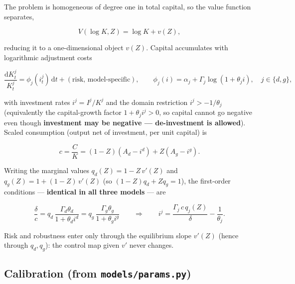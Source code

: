 \documentclass{article}
\begin{document}
The problem is homogeneous of degree one in total capital, so the value function
separates,

\begin{equation}
V(\log K, Z) = \log K + v(Z),
\end{equation}

reducing it to a one-dimensional object $v(Z)$. Capital accumulates with
logarithmic adjustment costs

\begin{equation}
\frac{\mathrm{d}K^j_t}{K^j_t} = \phi_j(i^j_t)\,\mathrm{d}t + (\text{risk, model-specific}),
\qquad
\phi_j(i) = \alpha_j + \Gamma_j\log(1+\theta_j i), \quad j\in\{d,g\},
\end{equation}

with investment rates $i^j = I^j/K^j$ and the domain restriction $i^j> -1/\theta_j$
(equivalently the capital-growth factor $1+\theta_j i^j>0$, so capital cannot go
negative even though \textbf{investment may be negative --- de-investment is allowed}).
Scaled consumption (output net of investment, per unit capital) is

\begin{equation}
c = \frac{C}{K} = (1-Z)(A_d - i^d) + Z(A_g - i^g).
\end{equation}

Writing the marginal values $q_d(Z) = 1 - Z\,v'(Z)$ and $q_g(Z) = 1 + (1 -Z)\,v'(Z)$
(so $(1 -Z)q_d + Z q_g = 1$), the first-order conditions --- \textbf{identical in all three
models} --- are

\begin{equation}
\frac{\delta}{c} = q_d\,\frac{\Gamma_d\theta_d}{1+\theta_d i^d}
                 = q_g\,\frac{\Gamma_g\theta_g}{1+\theta_g i^g}
\qquad\Longrightarrow\qquad
i^j = \frac{\Gamma_j\,c\,q_j(Z)}{\delta} - \frac{1}{\theta_j}.
\end{equation}

Risk and robustness enter only through the equilibrium slope $v'(Z)$ (hence
through $q_d,q_g$): the control map given $v'$ never changes.

\subsection*{Calibration (from \texttt{models/params.py})}
\end{document}
